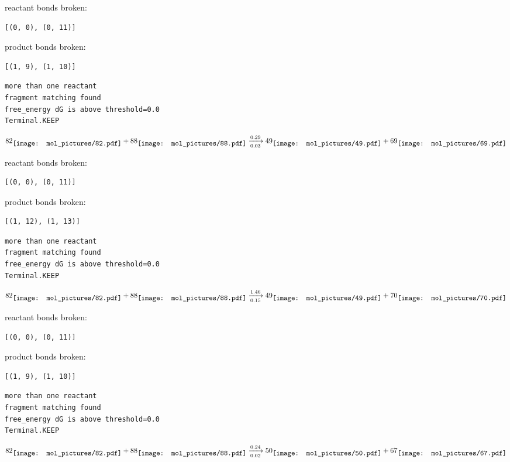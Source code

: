 \documentclass{article}
\begin{document}
reactant bonds broken:\begin{verbatim}
[(0, 0), (0, 11)]
\end{verbatim}
product bonds broken:\begin{verbatim}
[(1, 9), (1, 10)]
\end{verbatim}




\vspace{1cm}
\begin{verbatim}
more than one reactant
fragment matching found
free_energy dG is above threshold=0.0
Terminal.KEEP
\end{verbatim}
$$
82
\raisebox{-.5\height}{\texttt{[image: mol\_pictures/82.pdf]}}
+
88
\raisebox{-.5\height}{\texttt{[image: mol\_pictures/88.pdf]}}
\xrightarrow[0.03]{0.29}
49
\raisebox{-.5\height}{\texttt{[image: mol\_pictures/49.pdf]}}
+
69
\raisebox{-.5\height}{\texttt{[image: mol\_pictures/69.pdf]}}
$$


reactant bonds broken:\begin{verbatim}
[(0, 0), (0, 11)]
\end{verbatim}
product bonds broken:\begin{verbatim}
[(1, 12), (1, 13)]
\end{verbatim}




\vspace{1cm}
\begin{verbatim}
more than one reactant
fragment matching found
free_energy dG is above threshold=0.0
Terminal.KEEP
\end{verbatim}
$$
82
\raisebox{-.5\height}{\texttt{[image: mol\_pictures/82.pdf]}}
+
88
\raisebox{-.5\height}{\texttt{[image: mol\_pictures/88.pdf]}}
\xrightarrow[0.15]{1.46}
49
\raisebox{-.5\height}{\texttt{[image: mol\_pictures/49.pdf]}}
+
70
\raisebox{-.5\height}{\texttt{[image: mol\_pictures/70.pdf]}}
$$


reactant bonds broken:\begin{verbatim}
[(0, 0), (0, 11)]
\end{verbatim}
product bonds broken:\begin{verbatim}
[(1, 9), (1, 10)]
\end{verbatim}




\vspace{1cm}
\begin{verbatim}
more than one reactant
fragment matching found
free_energy dG is above threshold=0.0
Terminal.KEEP
\end{verbatim}
$$
82
\raisebox{-.5\height}{\texttt{[image: mol\_pictures/82.pdf]}}
+
88
\raisebox{-.5\height}{\texttt{[image: mol\_pictures/88.pdf]}}
\xrightarrow[0.02]{0.24}
50
\raisebox{-.5\height}{\texttt{[image: mol\_pictures/50.pdf]}}
+
67
\raisebox{-.5\height}{\texttt{[image: mol\_pictures/67.pdf]}}
$$
\end{document}
